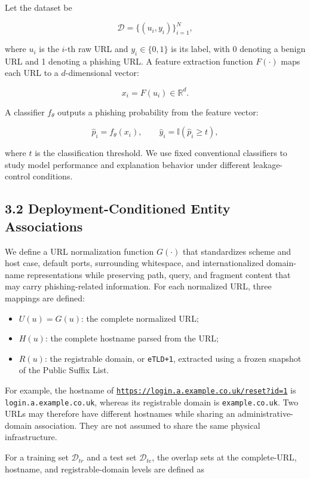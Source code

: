 \documentclass[
  10pt,
]{article}
\providecommand{\tightlist}{%
  \setlength{\itemsep}{0pt}\setlength{\parskip}{0pt}}
\begin{document}
Let the dataset be

\[
\mathcal{D}=\{(u_i,y_i)\}_{i=1}^{N},
\]

where \(u_i\) is the \(i\)-th raw URL and \(y_i\in\{0,1\}\) is its
label, with 0 denoting a benign URL and 1 denoting a phishing URL. A
feature extraction function \(F(\cdot)\) maps each URL to a
\(d\)-dimensional vector:

\[
x_i=F(u_i)\in\mathbb{R}^{d}.
\]

A classifier \(f_{\theta}\) outputs a phishing probability from the
feature vector:

\[
\hat{p}_i=f_{\theta}(x_i), \qquad \hat{y}_i=\mathbb{I}(\hat{p}_i\geq t),
\]

where \(t\) is the classification threshold. We use fixed conventional
classifiers to study model performance and explanation behavior under
different leakage-control conditions.

\subsection{3.2 Deployment-Conditioned Entity
Associations}\label{deployment-conditioned-entity-associations}

We define a URL normalization function \(G(\cdot)\) that standardizes
scheme and host case, default ports, surrounding whitespace, and
internationalized domain-name representations while preserving path,
query, and fragment content that may carry phishing-related information.
For each normalized URL, three mappings are defined:

\begin{itemize}
\tightlist
\item
  \(U(u)=G(u)\): the complete normalized URL;
\item
  \(H(u)\): the complete hostname parsed from the URL;
\item
  \(R(u)\): the registrable domain, or \texttt{eTLD+1}, extracted using
  a frozen snapshot of the Public Suffix
  List\citep{PublicSuffixList2026}.
\end{itemize}

For example, the hostname of
\texttt{\url{https://login.a.example.co.uk/reset?id=1}} is
\texttt{login.a.example.co.uk}, whereas its registrable domain is
\texttt{example.co.uk}. Two URLs may therefore have different hostnames
while sharing an administrative-domain association. They are not assumed
to share the same physical infrastructure.

For a training set \(\mathcal{D}_{tr}\) and a test set
\(\mathcal{D}_{te}\), the overlap sets at the complete-URL, hostname,
and registrable-domain levels are defined as
\end{document}
